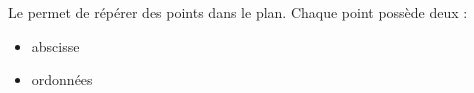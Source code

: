 Le  permet de répérer des points dans le plan.
Chaque point possède deux  :
\begin{itemize}
    \item abscisse
    \item ordonnées
\end{itemize}